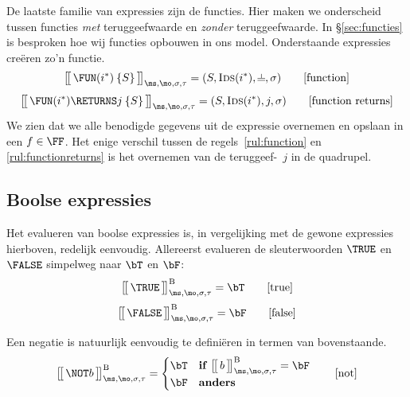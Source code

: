 De laatste familie van expressies zijn de functies. Hier maken we onderscheid tussen functies \emph{met} teruggeefwaarde en \emph{zonder} teruggeefwaarde. In §\ref{sec:functies} is besproken hoe wij functies opbouwen in ons model. Onderstaande expressies creëren zo'n functie.
%
\begin{equation}
  \Express{\FUN (i^*) \: \{S\}}{\ms,\mo,\sigma,\tau} = (S, \textsc{Ids}(i^*), \nil, \sigma)
  \tag*{[function]}\label{rul:function}
\end{equation}
%
\begin{equation}
  \Express{\FUN (i^*) \RETURNS j \: \{S\}}{\ms,\mo,\sigma,\tau} = (S, \textsc{Ids}(i^*), j, \sigma)
  \tag*{[function returns]}\label{rul:functionreturns}
\end{equation}
%
We zien dat we alle benodigde gegevens uit de expressie overnemen en opslaan in een $f\in\FF$. Het enige verschil tussen de regels~\ref{rul:function} en \ref{rul:functionreturns} is het overnemen van de teruggeef-\Id\ $j$ in de quadrupel.

\subsection{Boolse expressies}

Het evalueren van boolse expressies is, in vergelijking met de gewone expressies hierboven, redelijk eenvoudig. Allereerst evalueren de sleuterwoorden $\TRUE$ en $\FALSE$ simpelweg naar $\bT$ en $\bF$:
%
\begin{equation}
  \Express[B]{\TRUE}{\ms,\mo,\sigma,\tau} = \bT
  \tag*{[true]}
\end{equation}
%
\begin{equation}
  \Express[B]{\FALSE}{\ms,\mo,\sigma,\tau} = \bF
  \tag*{[false]}
\end{equation}

Een negatie is natuurlijk eenvoudig te definiëren in termen van bovenstaande.
%
\begin{equation}
  \Express[B]{\NOT b}{\ms,\mo,\sigma,\tau}
  = \begin{cases}
    \bT & \textbf{if } \Express[B]{b}{\ms,\mo,\sigma,\tau} = \bF \\
    \bF & \textbf{anders}
  \end{cases}
  \tag*{[not]}
\end{equation}

